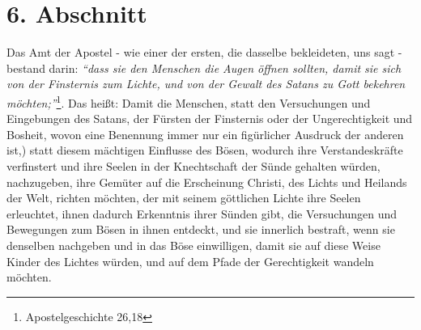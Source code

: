 \section{6. Abschnitt}  \label{kap2_ab6}

Das Amt der Apostel - wie einer der ersten, die dasselbe bekleideten, uns sagt -
bestand darin:
\textit{"`dass sie den Menschen die Augen öffnen sollten, damit sie
sich von der Finsternis zum Lichte, und von der Gewalt des Satans zu Gott
bekehren
möchten;"'}\footnote{Apostelgeschichte 26,18}.
Das heißt: Damit die Menschen, statt den
Versuchungen und Eingebungen des Satans, der Fürsten der
Finsternis oder der Ungerechtigkeit und Bosheit, wovon eine Benennung immer nur
ein figürlicher Ausdruck der anderen ist,) statt diesem mächtigen Einflusse des
Bösen, wodurch ihre Verstandeskräfte verfinstert und ihre Seelen in der
Knechtschaft der Sünde gehalten würden, nachzugeben, ihre Gemüter auf die
Erscheinung Christi, des Lichts und Heilands der Welt, richten möchten, der
mit seinem göttlichen Lichte ihre Seelen erleuchtet, ihnen dadurch Erkenntnis
ihrer Sünden gibt, die Versuchungen und Bewegungen zum Bösen in ihnen entdeckt,
und sie innerlich bestraft, wenn sie denselben nachgeben und in das Böse
einwilligen, damit sie auf diese Weise Kinder des Lichtes würden, und auf dem
Pfade der Gerechtigkeit wandeln möchten.

\medskip

